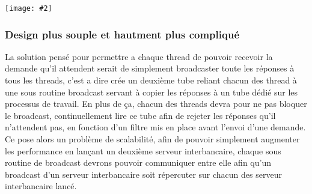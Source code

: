 \documentclass[french, a4paper, 12pt, titlepage]{article}
\newcommand{\graph}[2]{
\medskip
	\begin{center}
		\texttt{[image: \#2]}
	\end{center}
\medskip
}
\begin{document}
\graph{0.4}{piscine}


\subsubsection{Design plus souple et hautment plus compliqué}
La solution pensé pour permettre a chaque thread de pouvoir recevoir la demande qu'il attendent serait de simplement broadcaster toute les réponses à tous les threads, c'est a dire crée un deuxième tube reliant chacun des thread à une sous routine \og broadcast\fg{} servant à copier les réponses à un tube dédié sur les processus de travail.
En plus de ça, chacun des threads devra pour ne pas bloquer le broadcast, continuellement lire ce tube afin de rejeter les réponses qu'il n'attendent pas, en fonction d'un filtre mis en place avant l'envoi d'une demande.\\
\noindent
Ce pose alors un problème de scalabilité, afin de pouvoir simplement augmenter les performance en lançant un deuxième serveur interbancaire, chaque sous routine de broadcast devrons pouvoir communiquer entre elle afin qu'un broadcast d'un serveur interbancaire soit répercuter sur chacun des serveur interbancaire lancé.
\end{document}
